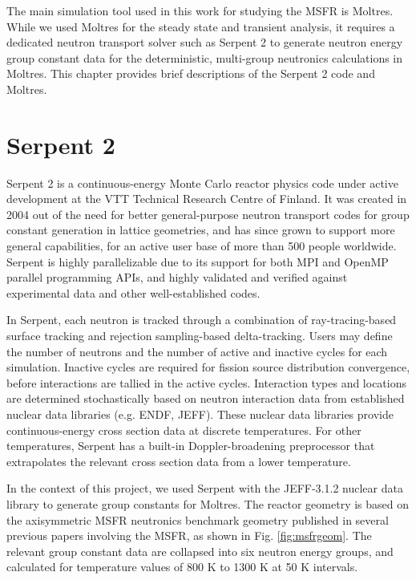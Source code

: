 The main simulation tool used in this work for studying the \gls{MSFR} is
Moltres. While we used Moltres for the steady state and transient analysis, it
requires a dedicated neutron transport solver such as Serpent 2 to generate
neutron energy group constant data for the deterministic, multi-group
neutronics calculations in Moltres. This chapter provides brief descriptions
of the Serpent 2 code and Moltres.

\section{Serpent 2}

Serpent 2 \cite{leppanen_serpent_2014} is a continuous-energy Monte Carlo
reactor physics code under
active development at the VTT Technical Research Centre of Finland. It was
created in 2004 out of the need for better general-purpose neutron transport
codes for group constant generation in lattice geometries, and has since grown
to support more general capabilities, for an active user base of more than 500
people worldwide. Serpent is highly parallelizable due to its support for
both MPI and OpenMP parallel programming APIs, and highly validated and
verified against experimental data and other well-established codes.

In Serpent, each neutron is tracked through a combination of ray-tracing-based
surface tracking and rejection sampling-based delta-tracking. Users may define
the number of neutrons and the number of active and inactive cycles for each
simulation. Inactive cycles are required for fission source distribution
convergence, before interactions are tallied in the active cycles.
Interaction types and locations are
determined stochastically based on neutron interaction data from established
nuclear data libraries (e.g. ENDF, JEFF). These nuclear data libraries provide
continuous-energy cross section data at discrete temperatures. For other
temperatures, Serpent has a built-in Doppler-broadening preprocessor that
extrapolates the relevant cross section data from a lower temperature. 

In the context of this project, we used Serpent with the JEFF-3.1.2 nuclear
data library \cite{oecd/nea_jeff-3.1.2_2014} to generate group constants
for Moltres. The reactor geometry is based on the axisymmetric \gls{MSFR}
neutronics benchmark geometry published in several previous papers involving
the \gls{MSFR}, as shown in Fig. \ref{fig:msfrgeom}. The relevant group
constant data are collapsed into six neutron energy groups, and calculated for
temperature values of 800 K to 1300 K at 50 K intervals.

